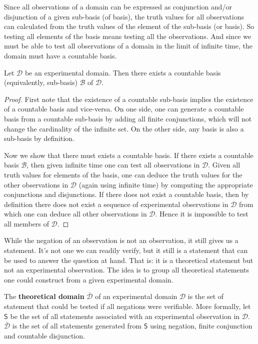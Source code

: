 \documentclass[11pt,letterpaper,fleqn]{memoir} %
\begin{document}
Since all observations of a domain can be expressed as conjunction and/or disjunction of a given sub-basis (of basis), the truth values for all observations can calculated from the truth values of the element of the sub-basis (or basis). So testing all elements of the basis means testing all the observations. And since we must be able to test all observations of a domain in the limit of infinite time, the domain must have a countable basis.

\begin{mathSection}

\begin{prop}
Let $\mathcal{D}$ be an experimental domain. Then there exists a countable basis (equivalently, sub-basis) $\mathcal{B}$ of $\mathcal{D}$.
\end{prop}

\begin{proof}
	First note that the existence of a countable sub-basis implies the existence of a countable basis and vice-versa. On one side, one can generate a countable basis from a countable sub-basis by adding all finite conjunctions, which will not change the cardinality of the infinite set. On the other side, any basis is also a sub-basis by definition.
	
	Now we show that there must exists a countable basis. If there exists a countable basis $\mathcal{B}$, then given infinite time one can test all observations in $\mathcal{D}$. Given all truth values for elements of the basis, one can deduce the truth values for the other observations in $\mathcal{D}$ (again using infinite time) by computing the appropriate conjunctions and disjunctions. If there does not exist a countable basis, then by definition there does not exist a sequence of experimental observations in $\mathcal{D}$ from which one can deduce all other observations in $\mathcal{D}$. Hence it is impossible to test all members of $\mathcal{D}$.
\end{proof}

\end{mathSection}

While the negation of an observation is not an observation, it still gives us a statement. It's not one we can readily verify, but it still is a statement that can be used to answer the question at hand. That is: it is a theoretical statement but not an experimental observation. The idea is to group all theoretical statements one could construct from a given experimental domain.

\begin{mathSection}
\begin{defn}
	The \textbf{theoretical domain} $\bar{\mathcal{D}}$ of an experimental domain $\mathcal{D}$ is the set of statement that could be tested if all negations were verifiable. More formally, let $\mathsf{S}$ be the set of all statements associated with an experimental observation in $\mathcal{D}$. $\bar{\mathcal{D}}$ is the set of all statements generated from $\mathsf{S}$ using negation, finite conjunction and countable disjunction.
\end{defn}
\end{mathSection}
\end{document}
